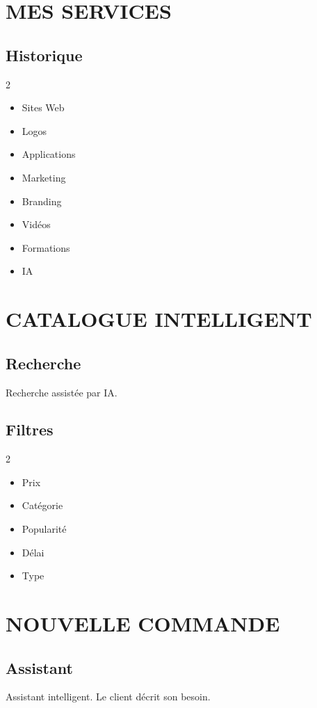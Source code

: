 \documentclass[12pt,a4paper,oneside]{book}
\begin{document}
\chapter{MES SERVICES}

\section{Historique}
\begin{multicols}{2}
\begin{itemize}
\item Sites Web
\item Logos
\item Applications
\item Marketing
\item Branding
\item Vidéos
\item Formations
\item IA
\end{itemize}
\end{multicols}

\chapter{CATALOGUE INTELLIGENT}

\section{Recherche}
Recherche assistée par IA.

\section{Filtres}
\begin{multicols}{2}
\begin{itemize}
\item Prix
\item Catégorie
\item Popularité
\item Délai
\item Type
\end{itemize}
\end{multicols}

\chapter{NOUVELLE COMMANDE}

\section{Assistant}
Assistant intelligent. Le client décrit son besoin.
\end{document}
